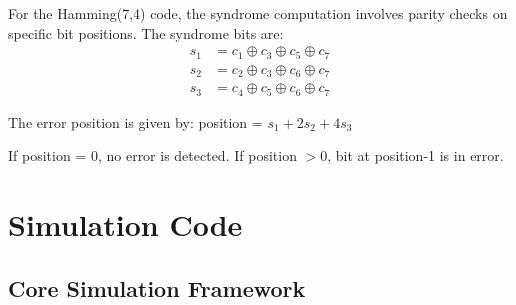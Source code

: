 \documentclass[12pt,a4paper]{article}
\begin{document}
For the Hamming(7,4) code, the syndrome computation involves parity checks on specific bit positions. The syndrome bits are:
\begin{align}
s_1 &= c_1 \oplus c_3 \oplus c_5 \oplus c_7\\
s_2 &= c_2 \oplus c_3 \oplus c_6 \oplus c_7\\
s_3 &= c_4 \oplus c_5 \oplus c_6 \oplus c_7
\end{align}

The error position is given by: position = $s_1 + 2s_2 + 4s_3$

If position = 0, no error is detected. If position $> 0$, bit at position-1 is in error.

\section{Simulation Code}

\subsection{Core Simulation Framework}
\end{document}
